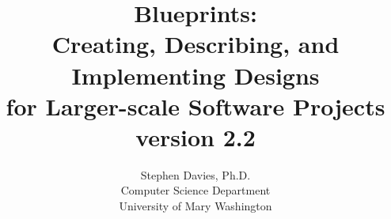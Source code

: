 \documentclass[11pt]{memoir}
\begin{document}
\title{{\Huge Blueprints:}\\
{\Large Creating, Describing, and Implementing Designs}\\
{\Large for Larger-scale Software Projects}\\{\small version 2.2}}
\author{Stephen Davies, Ph.D.\\Computer Science Department\\University of Mary Washington}
\date{}
\maketitle


\frontmatter

\renewcommand{\contentsname}{Contents}

\begingroup
  \null
  \newpage
\endgroup

\setcounter{tocdepth}{0}
\tableofcontents

%

\setcounter{chapter}{0}

\mainmatter



















\backmatter
\printindex


\shipout\null
\shipout\null
\end{document}
